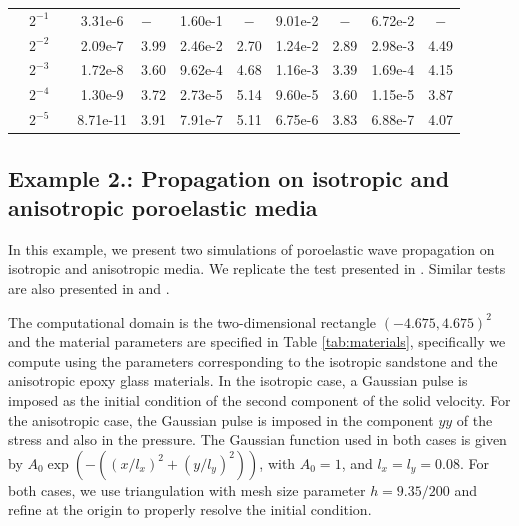 \documentclass[10pt,letterpaper]{amsart}
\theoremstyle{plain} %
\theoremstyle{remark} %
\begin{document}
\begin{table}[htbp!]
\begin{tabular}{@{\hskip .1in}ccl@{\hskip .1in}cl@{\hskip .1in}cc@{\hskip .1in}cc@{\hskip .1in}cc}
 & $2^{-1}$   & &3.31e-6      & $-$  &  1.60e-1   & $-$  & 9.01e-2   & $-$  & 6.72e-2  & $-$ \\
 & $2^{-2}$   & &2.09e-7      & 3.99 &  2.46e-2   & 2.70 & 1.24e-2   & 2.89 & 2.98e-3  & 4.49 \\
 & $2^{-3}$   & &1.72e-8      & 3.60 &  9.62e-4   & 4.68 & 1.16e-3   & 3.39 & 1.69e-4  & 4.15 \\
 & $2^{-4}$   & &1.30e-9      & 3.72 &  2.73e-5   & 5.14 & 9.60e-5   & 3.60 & 1.15e-5  & 3.87 \\
 & $2^{-5}$   & &8.71e-11      & 3.91 &  7.91e-7   & 5.11 & 6.75e-6   & 3.83 & 6.88e-7  & 4.07 \\
 \bottomrule
\end{tabular}
\label{tab:Ex1_near_incompressible}
\end{table}



\subsection*{Example 2.: Propagation on isotropic and anisotropic poroelastic  media}
In this example, we present two simulations of poroelastic wave propagation on isotropic and anisotropic media. We replicate the test presented in \cite{Alkhimenkov:2021}. Similar tests are also presented in \cite{Lemoine-Ou-LeVeque:2013} and \cite{laPuente-Dumbser-Kaser-Igel:2008}. 

The computational domain is the two-dimensional rectangle $(-4.675, 4.675)^{2}$ and the material parameters are specified in Table \ref{tab:materials}, specifically we compute using the parameters corresponding to the isotropic sandstone and the anisotropic epoxy glass materials. In the isotropic case, a Gaussian pulse is imposed as the initial condition of the second component of the solid velocity. For the anisotropic case, the Gaussian pulse is imposed in the component $yy$ of the stress and also in the pressure. The Gaussian function used in both cases is given by $A_0 \exp\left(-\left( (x/l_x)^{2} + (y/l_y)^2\right) \right)$, with $A_0 = 1$, and $l_x=l_y = 0.08.$ For both cases, we use triangulation with mesh size parameter $h=9.35/200$  and refine at the origin to properly resolve the initial condition.

%
\end{document}
